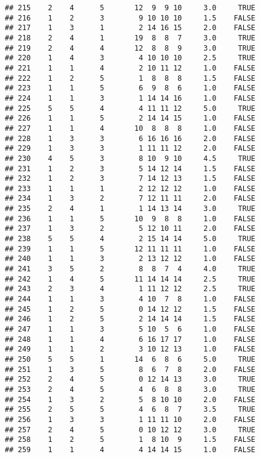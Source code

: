 \documentclass[]{article}
\begin{document}
\begin{verbatim}
## 215    2    4      5       12  9  9 10     3.0     TRUE
## 216    1    2      3        9 10 10 10     1.5    FALSE
## 217    1    3      1        2 14 16 15     2.0    FALSE
## 218    2    4      1       19  8  8  7     3.0     TRUE
## 219    2    4      4       12  8  8  9     3.0     TRUE
## 220    1    4      3        4 10 10 10     2.5     TRUE
## 221    1    1      4        2 10 11 12     1.0    FALSE
## 222    1    2      5        1  8  8  8     1.5    FALSE
## 223    1    1      5        6  9  8  6     1.0    FALSE
## 224    1    1      3        1 14 14 16     1.0    FALSE
## 225    5    5      4        4 11 11 12     5.0     TRUE
## 226    1    1      5        2 14 14 15     1.0    FALSE
## 227    1    1      4       10  8  8  8     1.0    FALSE
## 228    1    3      3        6 16 16 16     2.0    FALSE
## 229    1    3      3        1 11 11 12     2.0    FALSE
## 230    4    5      3        8 10  9 10     4.5     TRUE
## 231    1    2      3        5 14 12 14     1.5    FALSE
## 232    1    2      3        7 14 12 13     1.5    FALSE
## 233    1    1      1        2 12 12 12     1.0    FALSE
## 234    1    3      2        7 12 11 11     2.0    FALSE
## 235    2    4      1        1 14 13 14     3.0     TRUE
## 236    1    1      5       10  9  8  8     1.0    FALSE
## 237    1    3      2        5 12 10 11     2.0    FALSE
## 238    5    5      4        2 15 14 14     5.0     TRUE
## 239    1    1      5       12 11 11 11     1.0    FALSE
## 240    1    1      3        2 13 12 12     1.0    FALSE
## 241    3    5      2        8  8  7  4     4.0     TRUE
## 242    1    4      5       11 14 14 14     2.5     TRUE
## 243    2    3      4        1 11 12 12     2.5     TRUE
## 244    1    1      3        4 10  7  8     1.0    FALSE
## 245    1    2      5        0 14 12 12     1.5    FALSE
## 246    1    2      5        2 14 14 14     1.5    FALSE
## 247    1    1      3        5 10  5  6     1.0    FALSE
## 248    1    1      4        6 16 17 17     1.0    FALSE
## 249    1    1      2        3 10 12 13     1.0    FALSE
## 250    5    5      1       14  6  8  6     5.0     TRUE
## 251    1    3      5        8  6  7  8     2.0    FALSE
## 252    2    4      5        0 12 14 13     3.0     TRUE
## 253    2    4      5        4  6  8  8     3.0     TRUE
## 254    1    3      2        5  8 10 10     2.0    FALSE
## 255    2    5      5        4  6  8  7     3.5     TRUE
## 256    1    3      3        1 11 11 10     2.0    FALSE
## 257    2    4      5        0 10 12 12     3.0     TRUE
## 258    1    2      5        1  8 10  9     1.5    FALSE
## 259    1    1      4        4 14 14 15     1.0    FALSE

\end{verbatim}
\end{document}
